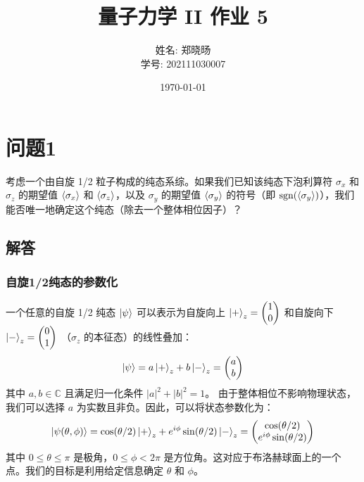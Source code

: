 \documentclass[12pt, a4paper]{article}
\begin{document}
\title{量子力学 II 作业 5}
\author{姓名: 郑晓旸 \\ 学号: 202111030007}
\date{ \today}
\maketitle

\section*{问题1}

考虑一个由自旋 1/2 粒子构成的纯态系综。如果我们已知该纯态下泡利算符 \(\sigma_x\) 和 \(\sigma_z\) 的期望值 \(\expval{\sigma_x}\) 和 \(\expval{\sigma_z}\)，以及 \(\sigma_y\) 的期望值 \(\expval{\sigma_y}\) 的符号（即 \(\text{sgn}(\expval{\sigma_y})\)），我们能否唯一地确定这个纯态（除去一个整体相位因子）？

\subsection*{解答}

\subsubsection*{自旋1/2纯态的参数化}
一个任意的自旋 1/2 纯态 \(\ket{\psi}\) 可以表示为自旋向上 \(\ket{+}_z = \begin{pmatrix} 1 \\ 0 \end{pmatrix}\) 和自旋向下 \(\ket{-}_z = \begin{pmatrix} 0 \\ 1 \end{pmatrix}\) （\(\sigma_z\) 的本征态）的线性叠加：
\[
\ket{\psi} = a \ket{+}_z + b \ket{-}_z = \begin{pmatrix} a \\ b \end{pmatrix}
\]
其中 \(a, b \in \mathbb{C}\) 且满足归一化条件 \(|a|^2 + |b|^2 = 1\)。
由于整体相位不影响物理状态，我们可以选择 \(a\) 为实数且非负。因此，可以将状态参数化为：
\[
\ket{\psi(\theta, \phi)} = \cos(\theta/2) \ket{+}_z + e^{i\phi} \sin(\theta/2) \ket{-}_z = \begin{pmatrix} \cos(\theta/2) \\ e^{i\phi} \sin(\theta/2) \end{pmatrix}
\]
其中 \(0 \le \theta \le \pi\) 是极角，\(0 \le \phi < 2\pi\) 是方位角。这对应于布洛赫球面上的一个点。我们的目标是利用给定信息确定 \(\theta\) 和 \(\phi\)。
\end{document}
